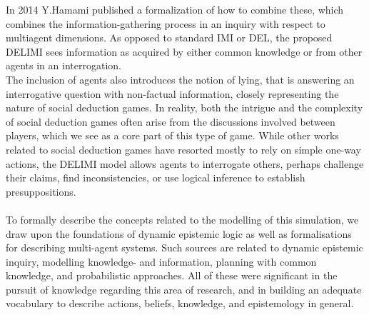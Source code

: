 In 2014 Y.Hamami\cite{delimi} published a formalization of how to combine
these, which combines the information-gathering process in an inquiry with
respect to multiagent dimensions. As opposed to standard IMI or DEL, the
proposed DELIMI sees information as acquired by either common knowledge or from
other agents in an interrogation. \\ The inclusion of agents also introduces
the notion of lying, that is answering an interrogative question with
non-factual information, closely representing the nature of social deduction
games. In reality, both the intrigue and the complexity of social deduction
games often arise from the discussions involved between players, which we see
as a core part of this type of game. While other works related to social
deduction games have resorted mostly to rely on simple one-way actions, the
DELIMI model allows agents to interrogate others, perhaps challenge their
claims, find inconsistencies, or use logical inference to establish
presuppositions.\\ \\ To formally describe the concepts related to the
modelling of this simulation, we draw upon the foundations of dynamic epistemic logic as well as 
formalisations for describing multi-agent systems. Such sources are related to
dynamic epistemic inquiry\cite{delimi}, modelling knowledge- and
information\cite{modelling_multi_agent_epistemic_systems}, planning with common
knowledge\cite{multi_agent_epistemic_planner_common_knowledge}, and
probabilistic approaches\cite{probibalistic_multiagent_systems}. All of these
were significant in the pursuit of knowledge regarding this area of research,
and in building an adequate vocabulary to describe actions, beliefs, knowledge,
and epistemology in general.